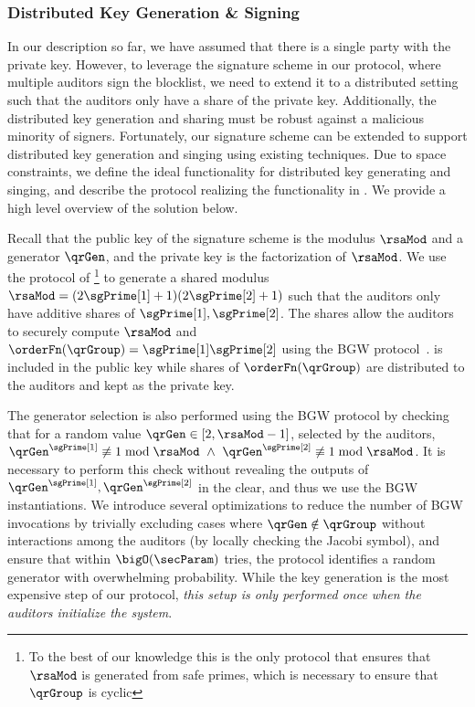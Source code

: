 \subsubsection{Distributed Key Generation \& Signing}
%
In our description so far, we have assumed that there is a single party with the private key. However, to leverage the signature scheme in our protocol, where multiple auditors sign the blocklist, we need to extend it to a distributed setting such that the auditors only have a share of the private key. Additionally, the distributed key generation and sharing must be robust against a malicious minority of signers. Fortunately, our signature scheme can be extended to support distributed key generation and singing using existing techniques. Due to space constraints, we define the ideal functionality \distSigningFunc for distributed key generating and singing, and describe the protocol realizing the functionality in . We provide a high level overview of the solution below. 

%
Recall that the public key of the signature scheme is the modulus $\rsaMod$ and a generator $\qrGen$, and the private key is the factorization of $\rsaMod$. We use the protocol of \citet{algesheimer2002efficient}\footnote{To the best of our knowledge this is the only protocol that ensures that $\rsaMod$ is generated from safe primes, which is necessary to ensure that $\qrGroup$ is cyclic} to generate a shared modulus $\rsaMod = (2 \sgPrime[1] + 1) (2 \sgPrime[2] + 1)$ such that the auditors only have additive shares of $\sgPrime[1], \sgPrime[2]$.  
 The shares allow the auditors to securely compute $\rsaMod$ and $\orderFn(\qrGroup) = \sgPrime[1] \sgPrime[2]$ using the BGW protocol~\cite{asharov2017full}. \rsaMod is included in the public key while shares of $\orderFn(\qrGroup)$ are distributed to the auditors and kept as the private key. 

The generator selection is also performed using the BGW protocol by checking that for a random value $\qrGen \in [2, \rsaMod -1]$, selected by the auditors, $\qrGen^{\sgPrime[1]} \not \equiv 1 \bmod \rsaMod ~\land ~\qrGen^{\sgPrime[2]} \not \equiv 1 \bmod \rsaMod$. 
It is necessary to perform this check without revealing the outputs of   
$\qrGen^{\sgPrime[1]}, \qrGen^{\sgPrime[2]}$ in the clear, and thus we use the BGW instantiations. We introduce several optimizations to reduce the number of BGW invocations by trivially excluding cases where $\qrGen \notin \qrGroup$ without interactions among the auditors (by locally checking the Jacobi symbol), and ensure that within $\bigO(\secParam)$ tries, the protocol identifies a random generator with overwhelming probability. While the key generation is the most expensive step of our protocol, \emph{this setup is only performed once when the auditors initialize the system}.


